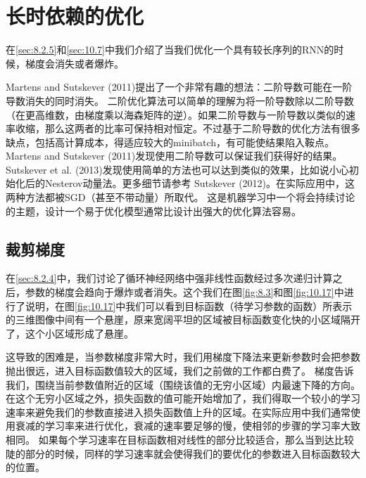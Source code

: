 \section{长时依赖的优化}
\label{sec:10.11}
在\ref{sec:8.2.5}和\ref{sec:10.7}中我们介绍了当我们优化一个具有较长序列的RNN的时候，梯度会消失或者爆炸。

 Martens and Sutskever (2011)提出了一个非常有趣的想法：二阶导数可能在一阶导数消失的同时消失。
二阶优化算法可以简单的理解为将一阶导数除以二阶导数（在更高维数，由梯度乘以海森矩阵的逆）。如果二阶导数与一阶导数以类似的速率收缩，那么这两者的比率可保持相对恒定。不过基于二阶导数的优化方法有很多缺点，包括高计算成本，得适应较大的minibatch，有可能使结果陷入鞍点。 Martens and Sutskever (2011)发现使用二阶导数可以保证我们获得好的结果。 Sutskever et al. (2013)发现使用简单的方法也可以达到类似的效果，比如说小心初始化后的Nesterov动量法。更多细节请参考 Sutskever (2012)。在实际应用中，这两种方法都被SGD（甚至不带动量）所取代。
这是机器学习中一个将会持续讨论的主题，设计一个易于优化模型通常比设计出强大的优化算法容易。


\subsection{裁剪梯度}
\label{sec:10.11.1}
在\ref{sec:8.2.4}中，我们讨论了循环神经网络中强非线性函数经过多次递归计算之后，参数的梯度会趋向于爆炸或者消失。这个我们在图\ref{fig:8.3}和图\ref{fig:10.17}中进行了说明，在图\ref{fig:10.17}中我们可以看到目标函数（待学习参数的函数）所表示的三维图像中间有一个悬崖，原来宽阔平坦的区域被目标函数变化快的小区域隔开了，这个小区域形成了悬崖。

这导致的困难是，当参数梯度非常大时，我们用梯度下降法来更新参数时会把参数抛出很远，进入目标函数值较大的区域，我们之前做的工作都白费了。
梯度告诉我们，围绕当前参数值附近的区域（围绕该值的无穷小区域）内最速下降的方向。在这个无穷小区域之外，损失函数的值可能开始增加了，我们得取一个较小的学习速率来避免我们的参数直接进入损失函数值上升的区域。在实际应用中我们通常使用衰减的学习率来进行优化，衰减的速率要足够的慢，使相邻的步骤的学习率大致相同。
如果每个学习速率在目标函数相对线性的部分比较适合，那么当到达比较陡的部分的时候，同样的学习速率就会使得我们的要优化的参数进入目标函数较大的位置。


